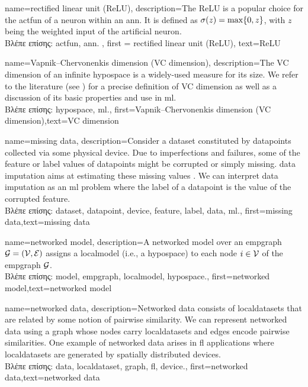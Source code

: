{name={rectified linear unit (ReLU)},
	description={The ReLU is 
		a popular choice for the \gls{actfun} of a neuron within an \gls{ann}. It is defined 
		as $\sigma(z) = \max\{0,z\}$, with $z$ being the weighted input of the artificial 
		neuron.\\
		\foreignlanguage{greek}{Βλέπε επίσης:} \gls{actfun}, \gls{ann}.
		}, first = {rectified linear unit (ReLU)}, text={ReLU} 
}

{name={Vapnik–Chervonenkis dimension (VC dimension)},
	description={The VC dimension of an infinite \gls{hypospace} is a widely-used measure 
		for its size. We refer to the literature (see \cite{ShalevMLBook}) for a precise definition of VC dimension 
		as well as a discussion of its basic properties and use in \gls{ml}.\\
		\foreignlanguage{greek}{Βλέπε επίσης:} \gls{hypospace}, \gls{ml}.},
	first={Vapnik–Chervonenkis dimension (VC dimension)},text={VC dimension}  
}

{name={missing data},
	description={Consider a \gls{dataset} constituted by \gls{datapoint}s collected via 
		some physical \gls{device}. Due to imperfections and failures, some of the \gls{feature} 
		or \gls{label} values of \gls{datapoint}s might be corrupted or simply missing. 
		\Gls{data} imputation aims at estimating these missing values \cite{Abayomi2008DiagnosticsFM}. 
		We can interpret \gls{data} imputation as an \gls{ml} problem where the \gls{label} of a \gls{datapoint} is 
		the value of the corrupted \gls{feature}.\\
		\foreignlanguage{greek}{Βλέπε επίσης:} \gls{dataset}, \gls{datapoint}, \gls{device}, \gls{feature}, \gls{label}, \gls{data}, \gls{ml}.},
	first={missing data},text={missing data}  
}

{name={networked model},
	description={A networked \gls{model} over an \gls{empgraph} $\mathcal{G} = \left( \mathcal{V},\mathcal{E} \right)$ assigns 
   		a \gls{localmodel} (i.e., a \gls{hypospace}) to each node $i \in \mathcal{V}$ of the \gls{empgraph} $\mathcal{G}$.\\
   \foreignlanguage{greek}{Βλέπε επίσης:} \gls{model}, \gls{empgraph}, \gls{localmodel}, \gls{hypospace}.}, 
   first={networked model},text={networked model}  
}

{name={networked data},
	description={Networked \gls{data} consists of \gls{localdataset}s 
		that are related by some notion of pairwise similarity. We can represent networked 
		\gls{data} using a \gls{graph} whose nodes carry \gls{localdataset}s and edges encode 
		pairwise similarities. One example of networked \gls{data} arises in \gls{fl} applications 
		where \gls{localdataset}s are generated by spatially distributed \gls{device}s.\\
	\foreignlanguage{greek}{Βλέπε επίσης:} \gls{data}, \gls{localdataset}, \gls{graph}, \gls{fl}, \gls{device}.}, 
	first={networked data},text={networked data}  
}

